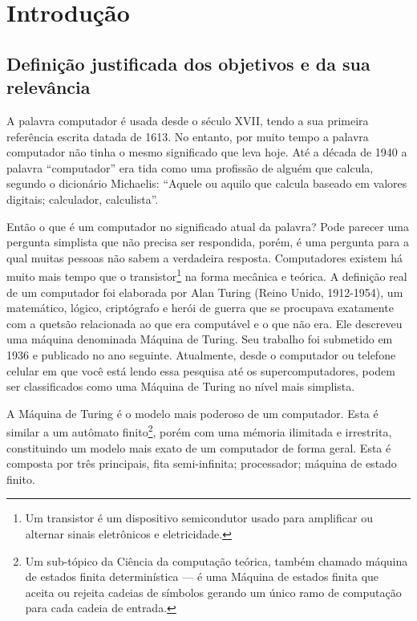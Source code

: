 \section{Introdução} 
\subsection{Definição justificada dos objetivos e da sua relevância}
A palavra computador é usada desde o século XVII, tendo a sua primeira referência escrita datada de 1613. No entanto, por muito tempo a palavra computador não tinha o mesmo significado que leva hoje. Até a década de 1940 a palavra “computador” era tida como uma profissão de alguém que calcula, segundo o dicionário Michaelis: “Aquele ou aquilo que calcula baseado em valores digitais; calculador, calculista”. \cite{4}

Então o que é um computador no significado atual da palavra? Pode parecer uma pergunta simplista que não precisa ser respondida, porém, é uma pergunta para a qual muitas pessoas não sabem a verdadeira resposta. Computadores existem há muito mais tempo que o transistor\footnote{Um transistor é um dispositivo semicondutor usado para amplificar ou alternar sinais eletrônicos e eletricidade.} na forma mecânica e teórica. A definição real de um computador foi elaborada por Alan Turing (Reino Unido, 1912-1954), um matemático, lógico, criptógrafo e herói de guerra que se procupava exatamente com a quetsão relacionada ao que era computável e o que não era. Ele descreveu uma máquina denominada Máquina de Turing. Seu trabalho foi submetido em 1936 e publicado no ano seguinte. Atualmente, desde o computador ou telefone celular em que você está lendo essa pesquisa até os supercomputadores, podem ser classificados como uma Máquina de Turing no nível mais simplista.

A Máquina de Turing é o modelo mais poderoso de um computador. Esta é similar a um autômato finito\footnote{Um sub-tópico da Ciência da computação teórica, também chamado máquina de estados finita determinística — é uma Máquina de estados finita que aceita ou rejeita cadeias de símbolos gerando um único ramo de computação para cada cadeia de entrada.}, porém com uma mémoria ilimitada e irrestrita, constituindo um modelo mais exato de um computador de forma geral. Esta é composta por três principais, fita semi-infinita; processador; máquina de estado finito. 

